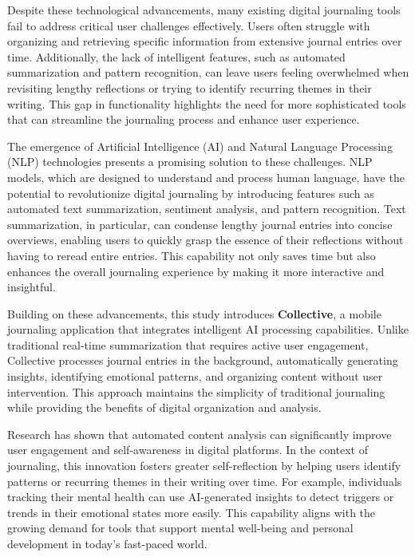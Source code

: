 Despite these technological advancements, many existing digital journaling tools fail to address critical user challenges effectively. Users often struggle with organizing and retrieving specific information from extensive journal entries over time. Additionally, the lack of intelligent features, such as automated summarization and pattern recognition, can leave users feeling overwhelmed when revisiting lengthy reflections or trying to identify recurring themes in their writing. This gap in functionality highlights the need for more sophisticated tools that can streamline the journaling process and enhance user experience.

The emergence of Artificial Intelligence (AI) and Natural Language Processing (NLP) technologies presents a promising solution to these challenges. NLP models, which are designed to understand and process human language, have the potential to revolutionize digital journaling by introducing features such as automated text summarization, sentiment analysis, and pattern recognition. Text summarization, in particular, can condense lengthy journal entries into concise overviews, enabling users to quickly grasp the essence of their reflections without having to reread entire entries. This capability not only saves time but also enhances the overall journaling experience by making it more interactive and insightful.

Building on these advancements, this study introduces \textbf{Collective}, a mobile journaling application that integrates intelligent AI processing capabilities. Unlike traditional real-time summarization that requires active user engagement, Collective processes journal entries in the background, automatically generating insights, identifying emotional patterns, and organizing content without user intervention. This approach maintains the simplicity of traditional journaling while providing the benefits of digital organization and analysis.

Research has shown that automated content analysis can significantly improve user engagement and self-awareness in digital platforms. In the context of journaling, this innovation fosters greater self-reflection by helping users identify patterns or recurring themes in their writing over time. For example, individuals tracking their mental health can use AI-generated insights to detect triggers or trends in their emotional states more easily. This capability aligns with the growing demand for tools that support mental well-being and personal development in today's fast-paced world.

